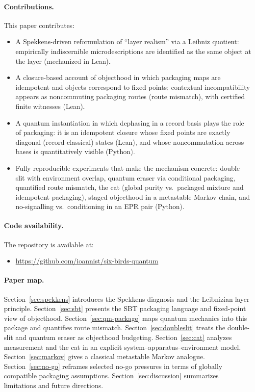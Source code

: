 \paragraph{Contributions.}
This paper contributes:
\begin{itemize}
  \item A Spekkens-driven reformulation of ``layer realism'' via a Leibniz quotient: empirically indiscernible microdescriptions are identified as the same object at the layer (mechanized in Lean).
  \item A closure-based account of objecthood in which packaging maps are idempotent and objects correspond to fixed points; contextual incompatibility appears as noncommuting packaging routes (route mismatch), with certified finite witnesses (Lean).
  \item A quantum instantiation in which dephasing in a record basis plays the role of packaging: it is an idempotent closure whose fixed points are exactly diagonal (record-classical) states (Lean), and whose noncommutation across bases is quantitatively visible (Python).
  \item Fully reproducible experiments that make the mechanism concrete: double slit with environment overlap, quantum eraser via conditional packaging, quantified route mismatch, the cat (global purity vs.\ packaged mixture and idempotent packaging), staged objecthood in a metastable Markov chain, and no-signalling vs.\ conditioning in an EPR pair (Python).
\end{itemize}

\paragraph{Code availability.}
The repository is available at:
\begin{itemize}
  \item \url{https://github.com/ioannist/six-birds-quantum}
\end{itemize}

\paragraph{Paper map.}
Section~\ref{sec:spekkens} introduces the Spekkens diagnosis and the Leibnizian layer principle. Section~\ref{sec:sbt} presents the SBT packaging language and fixed-point view of objecthood. Section~\ref{sec:qm-package} maps quantum mechanics into this package and quantifies route mismatch. Section~\ref{sec:doubleslit} treats the double-slit and quantum eraser as objecthood budgeting. Section~\ref{sec:cat} analyzes measurement and the cat in an explicit system--apparatus--environment model. Section~\ref{sec:markov} gives a classical metastable Markov analogue. Section~\ref{sec:no-go} reframes selected no-go pressures in terms of globally compatible packaging assumptions. Section~\ref{sec:discussion} summarizes limitations and future directions.
